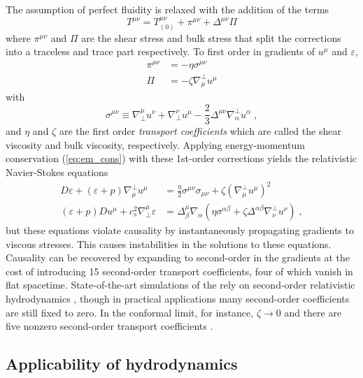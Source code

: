 The assumption of perfect fluidity is relaxed with the addition of the terms
\begin{equation}
T^{\mu\nu} = T^{\mu\nu}_{(0)} + \pi^{\mu\nu} + \Delta^{\mu\nu}\Pi
\end{equation}
where $\pi^{\mu\nu}$ and $\Pi$ are the shear stress and bulk stress that split the corrections into a traceless and trace part respectively.
To first order in gradients of $u^\mu$ and $\varepsilon$,
\begin{align}
  \label{eq:shear_stress}
  \pi^{\mu\nu} &= - \eta \sigma^{\mu\nu} \\
  \label{eq:bulk_stress}
  \Pi          &= - \zeta \nabla^\perp_\mu u^\mu
\end{align}
with
\begin{equation}
  \label{eq:sigma_tensor}
  \sigma^{\mu\nu} \equiv \nabla_\perp^\mu u^\nu + \nabla_\perp^\nu u^\mu - \frac{2}{3} \Delta^{\mu\nu}\nabla^\perp_\alpha u^\alpha \; ,
\end{equation}
and $\eta$ and $\zeta$ are the first order \emph{transport coefficients} which are called the shear viscosity and bulk viscosity, respectively.
Applying energy-momentum conservation (\cref{eq:em_cons}) with these 1st-order corrections yields the relativistic Navier-Stokes equations
\begin{align}
  D\varepsilon + \left(\varepsilon + p\right)\nabla^\perp_\mu u^\mu &= \frac{\eta}{2}\sigma^{\mu\nu}\sigma_{\mu\nu} + \zeta \left( \nabla^\perp_\mu u^\mu \right)^2 \\
  \left(\varepsilon + p\right)Du^\mu + c_s^2 \nabla_\perp^\mu \varepsilon &= \Delta^\mu_\beta \nabla_\alpha \left( \eta \sigma^{\alpha\beta} + \zeta \Delta^{\alpha\beta} \nabla^\perp_\nu u^\nu \right) \;,
\end{align}
but these equations violate causality by instantaneously propagating gradients to viscous stresses.
This causes instabilities in the solutions to these equations.
Causality can be recovered by expanding to second-order in the gradients \cite{Israel:1976tn} at the cost of introducing 15 second-order transport coefficients, four of which vanish in flat spacetime.
State-of-the-art simulations of the \qgp rely on second-order relativistic hydrodynamics \cite{Israel:1979wp}, though in practical applications many second-order coefficients are still fixed to zero.
In the conformal limit, for instance, $\zeta \rightarrow 0$ and there are five nonzero second-order transport coefficients \cite{Baier:2007ix,Marrochio:2013wla}.

\subsection{Applicability of hydrodynamics}
\label{subsec:hydro_applicability}

